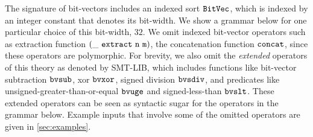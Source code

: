 \documentclass[english,a4paper,10pt]{article}
\begin{document}
\begin{appendix}
The signature of bit-vectors includes an indexed sort
${\tt BitVec}$, which is indexed by an integer constant that denotes
its bit-width. We show a grammar below for one particular
choice of this bit-width, $32$.
We omit indexed bit-vector operators
such as extraction function ${\tt (\_\ extract\ n\ m)}$, 
the concatenation function ${\tt concat}$,
since these operators are polymorphic.
For brevity,
we also omit the \emph{extended} operators of this theory
as denoted by SMT-LIB,
which includes functions like
bit-vector subtraction ${\tt bvsub}$,
xor ${\tt bvxor}$,
signed division ${\tt bvsdiv}$,
and predicates like
unsigned-greater-than-or-equal ${\tt bvuge}$
and signed-less-than ${\tt bvslt}$.
These extended operators can be seen as syntactic sugar for the
operators in the grammar below.
Example inputs that involve 
some of the omitted operators are given in \cref{sec:examples}.


\end{appendix}
\end{document}
